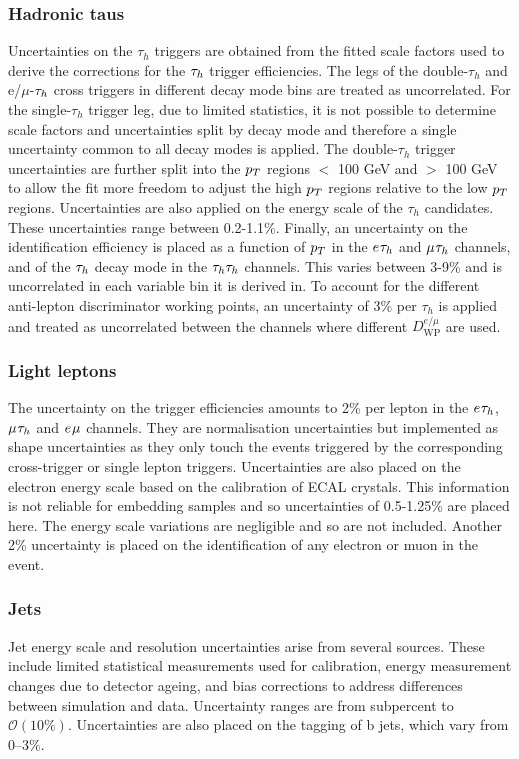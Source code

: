 \subsubsection{Hadronic taus}
Uncertainties on the $\tau_h$ triggers are obtained from the fitted scale factors used to derive the corrections for the $\tau_{h}$ trigger efficiencies.
The legs of the double-$\tau_h$ and e/$\mu$-$\tau_{h}$ cross triggers in different decay mode bins are treated as uncorrelated.
For the single-$\tau_h$ trigger leg, due to limited statistics, it is not possible to determine scale factors and uncertainties split by decay mode and therefore a single uncertainty common to all decay modes is applied.
The double-$\tau_h$ trigger uncertainties are further split into the $p_{T}$ regions $<$ 100 GeV and $>$ 100 GeV to allow the fit more freedom to adjust the high $p_{T}$ regions relative to the low $p_{T}$ regions.
Uncertainties are also applied on the energy scale of the $\tau_h$ candidates. 
These uncertainties range between 0.2-1.1\%. 
Finally, an uncertainty on the identification efficiency is placed as a function of $p_{T}$ in the $e_{}\tau_{h}$ and $\mu_{}\tau_{h}$ channels, and of the $\tau_{h}$ decay mode in the $\tau_{h}\tau_{h}$ channels. 
This varies between 3-9\% and is uncorrelated in each variable bin it is derived in.
To account for the different anti-lepton discriminator working points, an uncertainty of 3\% per $\tau_h$ is applied and treated as uncorrelated between the channels where different $D_{\text{WP}}^{e/\mu}$ are used.

\subsubsection{Light leptons}
The uncertainty on the trigger efficiencies amounts to 2\% per lepton in the $e_{}\tau_{h}$, $\mu_{}\tau_{h}$ and $e_{}\mu_{}$ channels.
They are normalisation uncertainties but implemented as shape uncertainties as they only touch the events triggered by the corresponding cross-trigger or single lepton triggers.
Uncertainties are also placed on the electron energy scale based on the calibration of \ac{ECAL} crystals.
This information is not reliable for embedding samples and so uncertainties of 0.5-1.25\% are placed here. 
The energy scale variations are negligible and so are not included.
Another 2\% uncertainty is placed on the identification of any electron or muon in the event.

\subsubsection{Jets}
Jet energy scale and resolution uncertainties arise from several sources. 
These include limited statistical measurements used for calibration, energy measurement changes due to detector ageing, and bias corrections to address differences between simulation and data. 
Uncertainty ranges are from subpercent to $\mathcal{O}(10\%)$.
Uncertainties are also placed on the tagging of b jets, which vary from 0--3\%.

